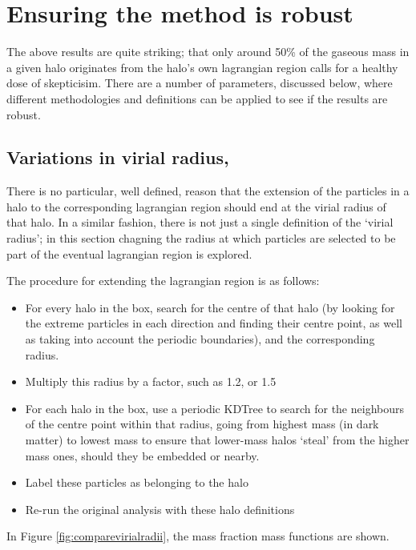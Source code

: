 \section{Ensuring the method is robust}
\label{sec:robustness}

The above results are quite striking; that only around 50\% of the gaseous
mass in a given halo originates from the halo's own lagrangian region calls
for a healthy dose of skepticisim. There are a number of parameters, discussed
below, where different methodologies and definitions can be applied to see
if the results are robust.

\subsection{Variations in virial radius, \rvir{}}

There is no particular, well defined, reason that the extension of the particles
in a halo to the corresponding lagrangian region should end at the virial radius
of that halo. In a similar fashion, there is not just a single definition of the
`virial radius'; in this section chagning the radius at which particles are
selected to be part of the eventual lagrangian region is explored.

The procedure for extending the lagrangian region is as follows:
\begin{itemize}
    \item For every halo in the box, search for the centre of that halo (by
          looking for the extreme particles in each direction and finding
          their centre point, as well as taking into account the periodic
          boundaries), and the corresponding radius.
    \item Multiply this radius by a factor, such as 1.2, or 1.5
    \item For each halo in the box, use a periodic KDTree to search for the
          neighbours of the centre point within that radius, going from
          highest mass (in dark matter) to lowest mass to ensure that
          lower-mass halos `steal' from the higher mass ones, should they
          be embedded or nearby.
    \item Label these particles as belonging to the halo
    \item Re-run the original analysis with these halo definitions
\end{itemize}

In Figure \ref{fig:comparevirialradii}, the mass fraction mass functions are
shown.


